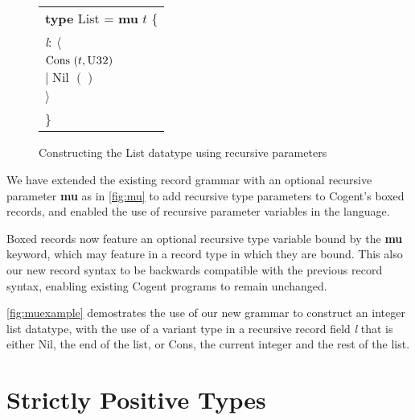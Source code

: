 \begin{figure}
    \centering
    \begin{tabular}{l}
        \textbf{type} List = \textbf{mu} $t$ \{ \\
            \phantom{x}\hspace{2em}\textit{l}: $\langle\;$ \\
            \phantom{x}\hspace{4em} $\text{Cons } (t,\textsc{U32})\;$ \\
            \phantom{x}\hspace{3.7em}$|\; \text{Nil } ()\;$ \\
            \phantom{x}\hspace{2em}$\rangle$ \\
        \} 
    \end{tabular}
    \vspace{2em}
    \caption{Constructing the List datatype using recursive parameters}
    \label{fig:muexample}
\end{figure}

We have extended the existing record grammar with an optional recursive parameter \textbf{mu} as in
\autoref{fig:mu} to add recursive type parameters to Cogent's boxed records, and enabled the use
of recursive parameter variables in the language.

Boxed records now feature an optional recursive type variable bound by the \textbf{mu} keyword, which may
feature in a record type in which they are bound. This also our new record syntax to be backwards
compatible with the previous record syntax, enabling existing Cogent programs to remain unchanged.

\autoref{fig:muexample} demostrates the use of our new grammar to construct an integer list datatype,
with the use of a variant type in a recursive record field \textit{l} that is either Nil,
the end of the list, or Cons, the current integer and the rest of the list.


\section{Strictly Positive Types}

